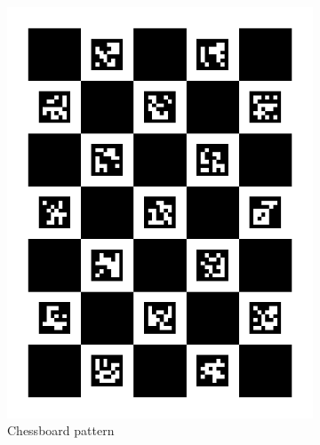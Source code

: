 \begin{figure}[H]
\centering
  \begin{subfigure}[b]{0.24 \textwidth}
    \includegraphics[width=\textwidth]{images/registration/charucoboard.png}
    \caption{Chessboard pattern}
    \label{figure:charucoboard}
  \end{subfigure}
  \hfill
  \begin{subfigure}[b]{0.24 \textwidth}

\end{subfigure}
\end{figure}
